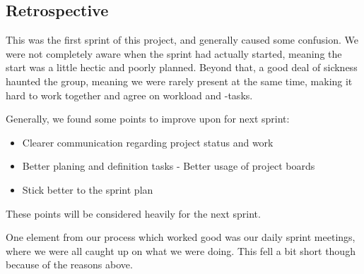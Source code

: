 \subsection{Retrospective}
This was the first sprint of this project, and generally caused some confusion. We were not completely aware when the sprint had actually started, meaning the start was a little hectic and poorly planned. Beyond that, a good deal of sickness haunted the group, meaning we were rarely present at the same time, making it hard to work together and agree on workload and -tasks.

Generally, we found some points to improve upon for next sprint:
\begin{itemize}
    \item Clearer communication regarding project status and work
    \item Better planing and definition tasks - Better usage of project boards
    \item Stick better to the sprint plan
\end{itemize}
These points will be considered heavily for the next sprint.

One element from our process which worked good was our daily sprint meetings, where we were all caught up on what we were doing. This fell a bit short though because of the reasons above.









